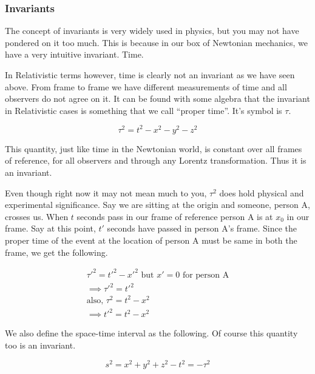 \documentclass[16pt]{scrartcl}
\numberwithin{equation}{section}
\theoremstyle{plain}
\theoremstyle{definition}
\begin{document}
\subsubsection*{Invariants}

The concept of invariants is very widely used in physics, but you may not have pondered on it too much. This is because in our box of Newtonian mechanics, we have a very intuitive invariant. Time. 

In Relativistic terms however, time is clearly not an invariant as we have seen above. From frame to frame we have different measurements of time and all observers do not agree on it. It can be found with some algebra that the invariant in Relativistic cases is something that we call ``proper time''. It's symbol is $\tau$.

\begin{equation}
    \tau^2 = t^2 - x^2 - y^2 - z^2
    \label{eq:propertime}
\end{equation}

This quantity, just like time in the Newtonian world, is constant over all frames of reference, for all observers and through any Lorentz transformation. Thus it is an invariant. 

Even though right now it may not mean much to you, $\tau^2$ does hold physical and experimental significance. Say we are sitting at the origin and someone, person A, crosses us. When $t$ seconds pass in our frame of reference person A is at $x_0$ in our frame. Say at this point, $t'$ seconds have passed in person A's frame. Since the proper time of the event at the location of person A must be same in both the frame, we get the following.

\begin{gather}
    \tau'^2 = t'^2 - x'^2 \text{ but } x'=0 \text{ for person A} \\
    \implies \tau'^2 = t'^2\\
    \text{also, } \tau^2 = t^2 - x^2\\
    \implies t'^2 = t^2 - x^2
    \label{eq:proper-time-significance}
\end{gather}

We also define the space-time interval as the following. Of course this quantity too is an invariant.

\begin{equation}
    s^2 = x^2 + y^2 + z^2 - t^2 = - \tau^2
    \label{eq:spacetime-interval}
\end{equation}
\end{document}
